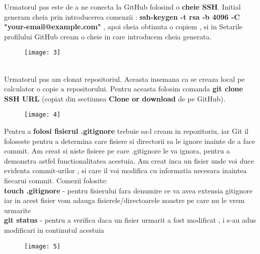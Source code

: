 \clearpage
\tab Urmatorul pas este de a ne conecta la GitHub folosind o \textbf{cheie SSH}. Initial generam cheia prin introducerea comenzii : \textbf{ssh-keygen -t rsa -b 4096 -C "your-email@example.com" }  , apoi cheia obtinuta o copiem , si in Setarile profilului GitHub cream o cheie in care introducem cheia generata. 
\begin{figure}[h]
\centering
\texttt{[image: 3]}
\end{figure}
\\
\tab Urmatorul pas am clonat repositoriul. Aceasta insemana ca se creaza local pe calculator o copie a repositorului. Pentru aceasta folosim comanda \textbf{git clone SSH URL} (copiat din sectiunea \textbf{Clone or download} de pe GitHub).
\begin{figure}[h]
\centering
\texttt{[image: 4]}
\end{figure}

\clearpage
\tab Pentru a \textbf{folosi fisierul .gitignore} trebuie sa-l cream in repozitoriu, iar Git il foloseste pentru a determina care fisiere si directorii sa le ignore inainte de a face commit. Am creat si niste fisiere pe care .gitignore le va ignora, pentru a demonstra astfel functionalitatea acestuia. Am creat inca un fisier unde voi duce evidenta commit-urilor , si care il voi modifica cu informatia necesara inaintea fiecarui commit. Comezii folosite: \\
\textbf{touch .gitignore} - pentru fisierului fara denumire ce va avea extensia gitignore iar in acest fisier vom adauga fisierele/directoarele noastre pe care nu le vrem urmarite\\
\textbf{git status} - pentru a verifica daca un fisier urmarit a fost modificat , i s-au adus modificari in continutul acestuia\\
\begin{figure}[h]
\centering
\texttt{[image: 5]}
\end{figure}

\clearpage